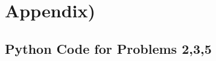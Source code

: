 \documentclass{article}
\begin{document}
	
		\section*{Appendix)}
			\subsection*{ Python Code for Problems 2,3,5 }
			
	
	
\end{document}
